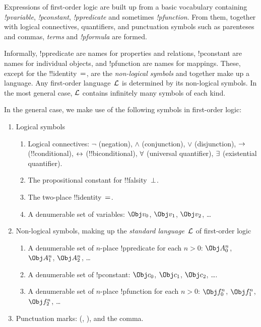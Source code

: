 \documentclass[open-logic-section]{subfiles}
\begin{document}

\begin{wordy}
Expressions of first-order logic are built up from a basic vocabulary
containing \emph{!p{variable}}, \emph{!p{constant}},
\emph{!p{predicate}} and sometimes \emph{!p{function}}.
  From them, together with logical connectives, quantifiers, and
  punctuation symbols such as parenteses and commas, \emph{terms} and
  \emph{!p{formula}} are formed.

Informally, !p{predicate} are names for properties and relations,
!p{constant} are names for individual objects, and !p{function} are names
for mappings.  These, except for the !!{identity}~$\eq$, are the
\emph{non-logical symbols} and together make up a language.  Any
first-order language~$\mathcal L$ is determined by its non-logical
symbols.  In the most general case, $\mathcal L$ contains infinitely
many symbols of each kind.
\end{wordy}

In the general case, we make use of the following symbols in
first-order logic:

\begin{enumerate}
\item Logical symbols
\begin{enumerate}
\item Logical connectives: $\lnot$ (negation), $\land$ (conjunction),
  $\lor$ (disjunction), $\to$ (!!{conditional}), $\leftrightarrow$ (!!{biconditional}),
  $\lforall$ (universal quantifier), $\lexists$ (existential
  quantifier).
\item The propositional constant for !!{falsity}~$\bot$.
\item The two-place !!{identity}~$\eq$.
\item A denumerable set of variables: $\Obj v_0$, $\Obj v_1$, $\Obj
  v_2$, \dots
\end{enumerate}
\item Non-logical symbols, making up the \emph{standard
  language}~$\mathcal L$ of first-order logic
\begin{enumerate}
\item A denumerable set of $n$-place !p{predicate} for each $n>0$: $\Obj
  A^n_0$, $\Obj A^n_1$, $\Obj A^n_2$, \dots
\item A denumerable set of !p{constant}: $\Obj c_0$, $\Obj c_1$, $\Obj
  c_2$, \dots.
\item A denumerable set of $n$-place !p{function} for each $n>0$:
  $\Obj f^n_0$, $\Obj f^n_1$, $\Obj f^n_2$, \dots
\end{enumerate}
\item Punctuation marks: (, ), and the comma.
\end{enumerate}
\end{document}

